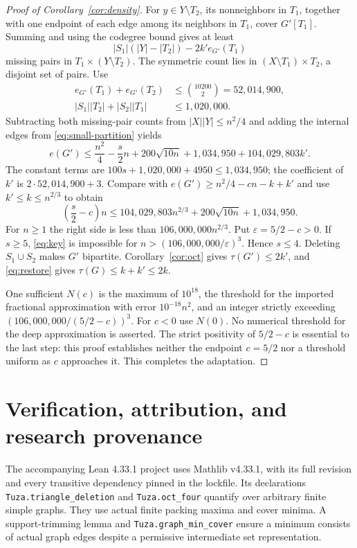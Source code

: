 \documentclass[11pt]{article}
\begin{document}
\begin{proof}[Proof of Corollary~\ref{cor:density}]
For $y\in Y\setminus T_2$, its nonneighbors in $T_1$, together with
one endpoint of each edge among its neighbors in $T_1$, cover $G'[T_1]$.
Summing and using the codegree bound gives at least
\begin{equation}\label{eq:missing}
|S_1|(|Y|-|T_2|)-2k'e_{G'}(T_1)
\end{equation}
missing pairs in $T_1\times(Y\setminus T_2)$. The symmetric count
lies in $(X\setminus T_1)\times T_2$, a disjoint set of pairs.
Use
\begin{equation}\label{eq:witness-numbers}
\begin{aligned}
e_{G'}(T_1)+e_{G'}(T_2)&\le\binom{10200}{2}=52,014,900,\\
|S_1||T_2|+|S_2||T_1|&\le1,020,000.
\end{aligned}
\end{equation}
Subtracting both missing-pair counts from $|X||Y|\le n^2/4$ and
adding the internal edges from \eqref{eq:small-partition} yields
\begin{equation}\label{eq:upper}
e(G')\le\frac{n^2}{4}-\frac{s}{2}n
 +200\sqrt{10n}+1,034,950+104,029,803k'.
\end{equation}
The constant terms are $100s+1,020,000+4950\le1,034,950$;
the coefficient of $k'$ is $2\cdot52,014,900+3$.
Compare with $e(G')\ge n^2/4-cn-k+k'$ and use
$k'\le k\le n^{2/3}$ to obtain
\begin{equation}\label{eq:key}
\left(\frac{s}{2}-c\right)n
\le104,029,803n^{2/3}+200\sqrt{10n}+1,034,950.
\end{equation}
For $n\ge1$ the right side is less than $106,000,000n^{2/3}$.
Put $\varepsilon=5/2-c>0$. If $s\ge5$, \eqref{eq:key} is impossible
for $n>(106,000,000/\varepsilon)^3$. Hence $s\le4$.
Deleting $S_1\cup S_2$ makes $G'$ bipartite. Corollary~\ref{cor:oct}
gives $\tau(G')\le2k'$, and \eqref{eq:restore} gives
$\tau(G)\le k+k'\le2k$.

One sufficient $N(c)$ is the maximum of $10^{18}$, the threshold for
the imported fractional approximation with error $10^{-18}n^2$, and
an integer strictly exceeding $(106,000,000/(5/2-c))^3$.
For $c<0$ use $N(0)$. No numerical threshold for the deep approximation
is asserted. The strict positivity of $5/2-c$ is essential to the
last step: this proof establishes neither the endpoint $c=5/2$ nor a
threshold uniform as $c$ approaches it. This completes the adaptation.
\end{proof}

\section{Verification, attribution, and research provenance}
The accompanying Lean 4.33.1 project uses Mathlib v4.33.1, with its full
revision and every transitive dependency pinned in the lockfile.
Its declarations \texttt{Tuza.triangle\_deletion} and
\texttt{Tuza.oct\_four} quantify over arbitrary finite simple graphs.
They use actual finite packing maxima and cover minima. A support-trimming
lemma and \texttt{Tuza.graph\_min\_cover} ensure a minimum consists of
actual graph edges despite a permissive intermediate set representation.
\end{document}
